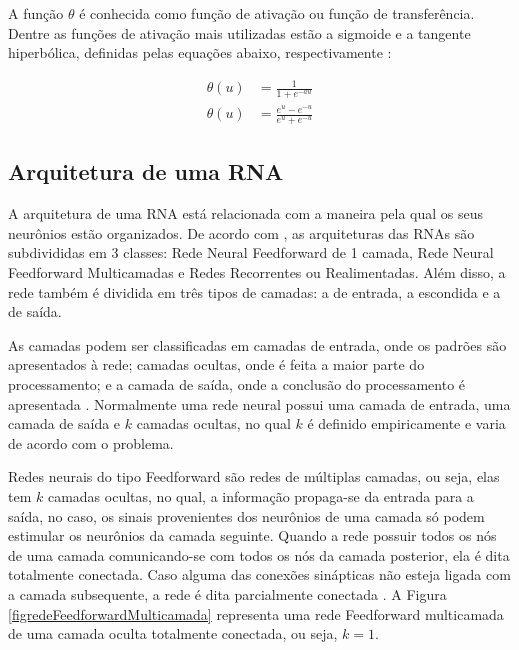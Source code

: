A função \(\theta\) é conhecida como função de ativação ou função de transferência. Dentre as funções de ativação mais utilizadas estão a sigmoide e a tangente hiperbólica, definidas pelas equações abaixo, respectivamente \cite{articlefunclogtan}:

\begin{equation} \label{eq2}
\begin{split}
\theta(u) & = \frac{1}{1+ e^{-au}}\\
\theta(u) & = \frac{e^u - e^{-u}}{e^u + e^{-u}}
\end{split}
\end{equation}

\subsection{Arquitetura de uma RNA}

A arquitetura de uma RNA está relacionada com a maneira pela qual os seus neurônios estão organizados. De acordo com \cite{furtado2019redes}, as arquiteturas das RNAs são subdivididas em 3 classes: Rede Neural Feedforward de 1 camada, Rede Neural Feedforward Multicamadas e Redes Recorrentes ou Realimentadas. Além disso, a rede também é dividida em três tipos de camadas: a de entrada, a escondida e a de saída. 


As camadas podem ser classificadas em camadas de entrada, onde os padrões são apresentados à rede; camadas ocultas, onde é feita a maior parte do processamento; e a camada de saída, onde a conclusão do processamento é apresentada \cite{furtado2019redes}. Normalmente uma rede neural possui uma camada de entrada, uma camada de saída e \(k\) camadas ocultas, no qual \(k\) é definido empiricamente e varia de acordo com o problema.

Redes neurais do tipo Feedforward são redes de múltiplas camadas, ou seja, elas tem \(k\) camadas ocultas, no qual, a informação propaga-se da entrada para a saída, no caso, os sinais provenientes dos neurônios de uma camada só podem estimular os neurônios da camada seguinte. Quando a rede possuir todos os nós de uma camada comunicando-se com todos os nós da camada posterior, ela é dita totalmente conectada. Caso alguma das conexões sinápticas não esteja ligada com a camada subsequente, a rede é dita parcialmente conectada \cite{furtado2019redes}. A Figura \ref{figredeFeedforwardMulticamada} representa uma rede Feedforward multicamada de uma camada oculta totalmente conectada, ou seja, $k=1$.


